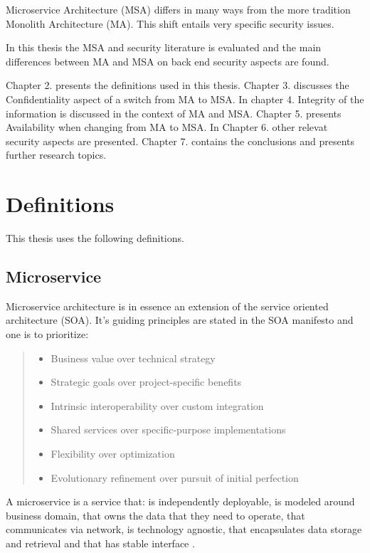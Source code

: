 \begin{sloppypar}
    Microservice Architecture (MSA) differs in many ways from 
    the more tradition Monolith Architecture (MA). This shift entails very 
    specific security issues.

    In this thesis the MSA and security literature is evaluated and the main 
    differences between MA and MSA on back end security aspects are found.

    Chapter 2. presents the definitions used in this thesis. 
    Chapter 3. discusses the Confidentiality aspect of a switch from MA to MSA. 
    In chapter 4. Integrity of the information is discussed in the context of 
    MA and MSA. 
    Chapter 5. presents Availability when changing from MA to MSA.
    In Chapter 6. other relevat security aspects are presented.
    Chapter 7. contains the conclusions and presents further research topics.

\end{sloppypar}

\section{Definitions}
\begin{sloppypar}
    This thesis uses the following definitions.
\end{sloppypar}



\subsection{Microservice}
\begin{sloppypar}

    Microservice architecture is in essence an extension of the service oriented 
    architecture (SOA). It's guiding principles are stated in the SOA manifesto 
    \citep{soamanifesto} and one is to prioritize:
    \begin{quotation}
        \noindent \it
        \begin{itemize}
            \item Business value over technical strategy
            \item Strategic goals over project-specific benefits 
            \item Intrinsic interoperability over custom integration 
            \item Shared services over specific-purpose implementations 
            \item Flexibility over optimization 
            \item Evolutionary refinement over pursuit of initial perfection
        \end{itemize}
    \end{quotation}

    A microservice is a service that: is independently deployable,
    is modeled around business domain,
    that owns the data that they need to operate,
    that communicates via network,
    is technology agnostic,
    that encapsulates data storage and retrieval and 
    that has stable interface \citep{newman2019}.
\end{sloppypar}

